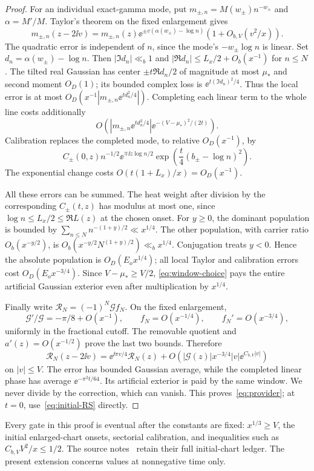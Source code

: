 \begin{proof}
For an individual exact-gamma mode, put
$m_{\pm,n}=M(w_\pm)n^{-w_\pm}$ and $\alpha=M'/M$. Taylor's theorem
on the fixed enlargement gives
\[
 m_{\pm,n}(z-2\ii v)
 =m_{\pm,n}(z)\ee^{\pm v(\alpha(w_\pm)-\log n)}
      (1+O_{b,V}(v^2/x)).
\]
The quadratic error is independent of $n$, since the mode's
$-w_\pm\log n$ is linear. Set $d_n=\alpha(w_\pm)-\log n$.
Then $|\Im d_n|\ll_b1$ and
$|\Re d_n|\le L_x/2+O_b(x^{-1})$ for $n\le N$.
The tilted real Gaussian has center $\pm t\Re d_n/2$ of magnitude
at most $\mu_*$ and second moment $O_D(1)$; its bounded complex loss
is $\ee^{t(\Im d_n)^2/4}$. Thus the local error is at most
$O_D(x^{-1}|m_{\pm,n}\ee^{td_n^2/4}|)$.
Completing each linear term to the whole line costs additionally
\[
 O\left(|m_{\pm,n}\ee^{td_n^2/4}|
           \ee^{-(V-\mu_*)^2/(2t)}\right).
\]
Calibration replaces the completed mode, to relative $O_D(x^{-1})$,
by
\[
 C_\pm(0,z)n^{-1/2}\ee^{\mp\ii z\log n/2}
          \exp\left(\frac t4(b_\pm-\log n)^2\right).
\]
The exponential change costs $O(t(1+L_x)/x)=O_D(x^{-1})$.

All these errors can be summed. The heat weight after division by
the corresponding $C_\pm(t,z)$ has modulus at most one, since
$\log n\le L_x/2\le\Re L(z)$ at the chosen onset.
For $y\ge0$, the dominant population is bounded by
$\sum_{n\le N}n^{-(1+y)/2}\ll x^{1/4}$.
The other population, with carrier ratio $O_b(x^{-y/2})$, is
$O_b(x^{-y/2}N^{(1+y)/2})\ll_b x^{1/4}$.
Conjugation treats $y<0$. Hence the absolute population is
$O_D(E_ox^{1/4})$; all local Taylor and calibration errors cost
$O_D(E_ox^{-3/4})$. Since $V-\mu_*\ge V/2$,
\eqref{eq:window-choice} pays the entire artificial Gaussian exterior
even after multiplication by $x^{1/4}$.

Finally write $\mathcal R_N=(-1)^N\mathcal G f_N$.
On the fixed enlargement,
\[
 \mathcal G'/\mathcal G=-\pi/8+O(x^{-1}),\qquad
 f_N=O(x^{-1/4}),\qquad f_N'=O(x^{-3/4}),
\]
uniformly in the fractional cutoff. The removable quotient and
$a'(z)=O(x^{-1/2})$ prove the last two bounds. Therefore
\[
 \mathcal R_N(z-2\ii v)=\ee^{\ii\pi v/4}\mathcal R_N(z)
     +O(|\mathcal G(z)|x^{-3/4}|v|\ee^{C_{b,V}|v|})
\]
on $|v|\le V$. The error has bounded Gaussian average, while the
completed linear phase has average $\ee^{-\pi^2t/64}$.
Its artificial exterior is paid by the same window. We never divide
by the correction, which can vanish. This proves~\eqref{eq:provider};
at $t=0$, use~\eqref{eq:initial-RS} directly.
\end{proof}

Every gate in this proof is eventual after the constants are fixed:
$x^{1/3}\ge V$, the initial enlarged-chart onsets, sectorial calibration,
and inequalities such as $C_{b,V}V^2/x\le1/2$.
The source notes~\cite{BB06,BB12} retain their full initial-chart ledger.
The present extension concerns values at nonnegative time only.

